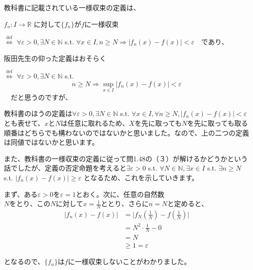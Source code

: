 \documentclass{jsarticle}
\begin{document}
教科書に記載されている一様収束の定義は、

\bigskip

$f_n : I \to \mathbb{R}$ に対して$\{f_n\}がf$に一様収束

$\stackrel{\mathrm{def}}{\Longleftrightarrow}$
$\forall \varepsilon > 0, \exists N \in \mathbb{N}$ s.t. $\forall x \in I, n \ge N \Rightarrow |f_n(x) -f(x)| < \varepsilon$　であり、

\bigskip

阪田先生の仰った定義はおそらく

$\stackrel{\mathrm{def}}{\Longleftrightarrow}$
$\forall \varepsilon > 0, \exists N \in \mathbb{N}$ s.t. \[n \ge N \Rightarrow \sup_{x \in I}|f_n(x) -f(x)|< \varepsilon\]　だと思うのですが、

教科書のほうの定義は$\forall \varepsilon > 0, \exists N \in \mathbb{N}$ s.t. $\forall x \in I, \forall n \ge N, |f_n(x) -f(x)| < \varepsilon$　とも表せて、$x$と$N$は任意に取れるため、$X$を先に取っても$N$を先に取っても取る順番はどちらでも構わないのではないかと思いました。なので、上の二つの定義は同値ではないかと思います。

\bigskip

また、教科書の一様収束の定義に従って問1.48の（３）が解けるかどうかという話でしたが、定義の否定命題を考えると$\exists \varepsilon > 0$ s.t. $\forall N \in \mathbb{N}, \exists x \in I$ s.t. $\exists n \ge N$ s.t. $|f_n(x) -f(x)| \ge \varepsilon$ となるため、これを示していきます。

\bigskip

まず、ある$\varepsilon > 0を\varepsilon = 1$とおく。次に、任意の自然数$Nをとり、このNに対してx=\frac{1}{N}ととり、さらにn=N$と定めると、
\begin{align*}
|f_n(x)-f(x)| &= \biggl|f_N\left(\frac{1}{N} \right)-f\left(\frac{1}{N} \right) \biggr|\\
              &= N^2 \cdot \frac{1}{N} - 0\\
              &= N\\
              &\ge 1 = \varepsilon
\end{align*}

となるので、$\{f_n\}はf$に一様収束しないことがわかりました。
              
\end{document}
